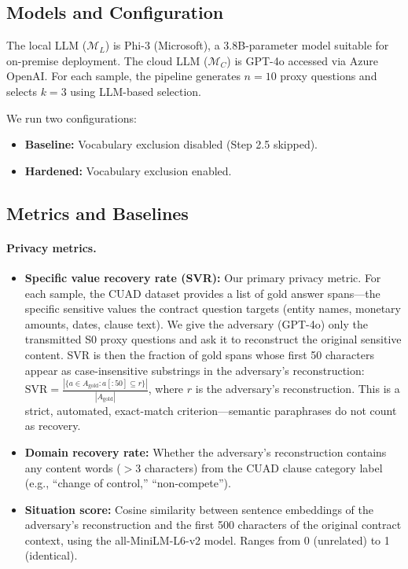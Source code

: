 \documentclass[sigconf,balance=false]{acmart}
\begin{document}
\subsection{Models and Configuration}
\label{sec:models}

The local LLM ($\mathcal{M}_L$) is Phi-3 (Microsoft), a 3.8B-parameter model suitable for on-premise deployment.
The cloud LLM ($\mathcal{M}_C$) is GPT-4o accessed via Azure OpenAI.
For each sample, the pipeline generates $n = 10$ proxy questions and selects $k = 3$ using LLM-based selection.

We run two configurations:
\begin{itemize}
\item \textbf{Baseline:} Vocabulary exclusion disabled (Step 2.5 skipped).
\item \textbf{Hardened:} Vocabulary exclusion enabled.
\end{itemize}

\subsection{Metrics and Baselines}
\label{sec:metrics}

\paragraph{Privacy metrics.}
\begin{itemize}
\item \textbf{Specific value recovery rate (SVR):} Our primary privacy metric. For each sample, the CUAD dataset provides a list of gold answer spans---the specific sensitive values the contract question targets (entity names, monetary amounts, dates, clause text). We give the adversary (GPT-4o) only the transmitted S0 proxy questions and ask it to reconstruct the original sensitive content. SVR is then the fraction of gold spans whose first 50 characters appear as case-insensitive substrings in the adversary's reconstruction: $\text{SVR} = \frac{|\{a \in A_\text{gold} : a[:50] \subseteq r\}|}{|A_\text{gold}|}$, where $r$ is the adversary's reconstruction. This is a strict, automated, exact-match criterion---semantic paraphrases do not count as recovery.
\item \textbf{Domain recovery rate:} Whether the adversary's reconstruction contains any content words ($>$3 characters) from the CUAD clause category label (e.g., ``change of control,'' ``non-compete'').
\item \textbf{Situation score:} Cosine similarity between sentence embeddings of the adversary's reconstruction and the first 500 characters of the original contract context, using the all-MiniLM-L6-v2 model. Ranges from 0 (unrelated) to 1 (identical).
\end{itemize}
\end{document}
